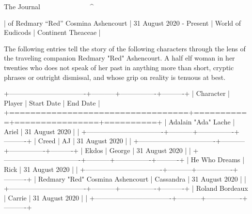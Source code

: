 The Journal
^^^^^^^^^^^^^^^^^^^^^^^^^^^^^^^^^^^^^^^^^^^^^^^^^^^^^^^^^^^^^^^^^^^^^^^^^^^^

| of Redmary “Red” Cosmina Ashencourt
| 31 August 2020 - Present
| World of Eudicods
| Continent Theaceae
|

The following entries tell the story of the following characters through the lens of the traveling companion Redmary "Red" Ashencourt.  A half elf woman in her twenties who does not speak of her past in anything more than short, cryptic phrases or outright dismissal, and whose grip on reality is tenuous at best.

+----------------------------------+-----------+----------------+----------+
| Character                        | Player    | Start Date     | End Date |
+==================================+===========+================+==========+
| Adalain "Ada" Lache              | Ariel     | 31 August 2020 |          |
+----------------------------------+-----------+----------------+----------+
| Creed                            | AJ        | 31 August 2020 |          |
+----------------------------------+-----------+----------------+----------+
| Ekdos                            | George    | 31 August 2020 |          |
+----------------------------------+-----------+----------------+----------+
| He Who Dreams                    | Rick      | 31 August 2020 |          |
+----------------------------------+-----------+----------------+----------+
| Redmary "Red" Cosmina Ashencourt | Cassandra | 31 August 2020 |          |
+----------------------------------+-----------+----------------+----------+
| Roland Bordeaux                  | Carrie    | 31 August 2020 |          |
+----------------------------------+-----------+----------------+----------+
